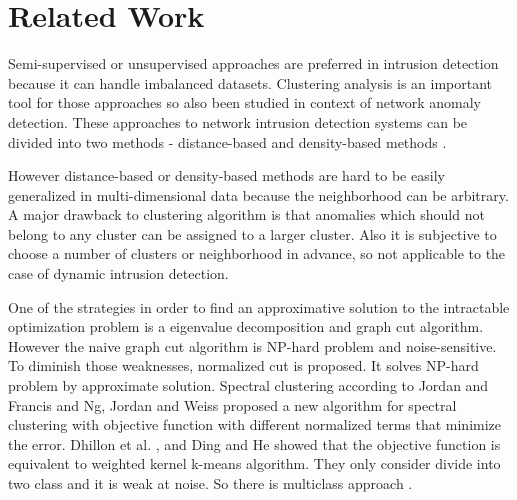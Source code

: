 \section{Related Work}
Semi-supervised or unsupervised approaches are preferred in intrusion detection \cite{chandola09} because it can handle imbalanced datasets.
Clustering analysis is an important tool for those approaches so also been studied in context of network anomaly detection. 
These approaches to network intrusion detection systems can be divided into two methods - distance-based \cite{knorr00}\cite{ramaswamy00} and density-based methods \cite{breuning00}\cite{aggarwal01}. 

However distance-based or density-based methods are hard to be easily generalized in multi-dimensional data because the neighborhood can be arbitrary. 
A major drawback to clustering algorithm is that anomalies which should not belong to any cluster can be assigned to a larger cluster. 
Also it is subjective to choose a number of clusters or neighborhood in advance, so not applicable to the case of dynamic intrusion detection. 

One of the strategies in order to find an approximative solution to the intractable optimization problem is a eigenvalue decomposition and graph cut algorithm. 
However the naive graph cut algorithm is NP-hard problem and noise-sensitive. 
To diminish those weaknesses, normalized cut \cite{jianbo00} is proposed. 
It solves NP-hard problem by approximate solution.
Spectral clustering according to Jordan and Francis \cite{jordan04} and Ng, Jordan and Weiss \cite{ng01} proposed a new algorithm for spectral clustering with objective function with different normalized terms that minimize the error.
Dhillon et al. \cite{dhillon04}, and Ding and He \cite{cding04} showed that the objective function is equivalent to weighted kernel k-means algorithm.
They only consider divide into two class and it is weak at noise. 
So there is multiclass approach \cite{jianbo03}. 

